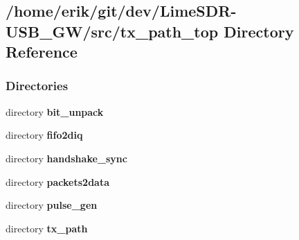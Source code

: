 \subsection{/home/erik/git/dev/\+Lime\+S\+D\+R-\/\+U\+S\+B\+\_\+\+G\+W/src/tx\+\_\+path\+\_\+top Directory Reference}
\label{dir_81edac20f86b52163df94b845540022e}
\subsubsection*{Directories}
\begin{DoxyCompactItemize}
\item 
directory {\bf bit\+\_\+unpack}
\item 
directory {\bf fifo2diq}
\item 
directory {\bf handshake\+\_\+sync}
\item 
directory {\bf packets2data}
\item 
directory {\bf pulse\+\_\+gen}
\item 
directory {\bf tx\+\_\+path}
\end{DoxyCompactItemize}
